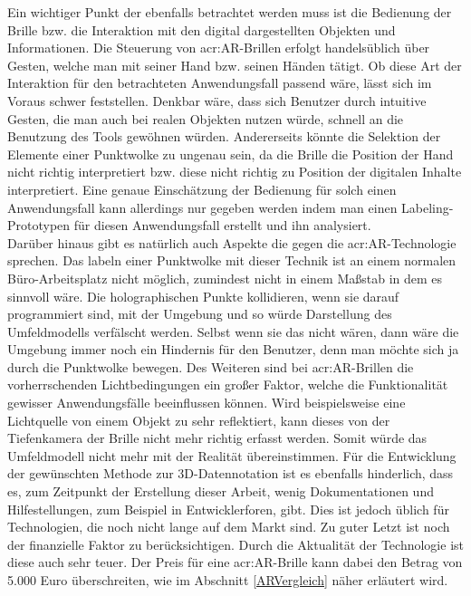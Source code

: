 Ein wichtiger Punkt der ebenfalls betrachtet werden muss ist die Bedienung der Brille bzw. die Interaktion mit den digital dargestellten Objekten und Informationen. Die Steuerung von \acrshort{acr:AR}-Brillen erfolgt handelsüblich über Gesten, welche man mit seiner Hand bzw. seinen Händen tätigt. Ob diese Art der Interaktion für den betrachteten Anwendungsfall passend wäre, lässt sich im Voraus schwer feststellen. Denkbar wäre, dass sich Benutzer durch intuitive Gesten, die man auch bei realen Objekten nutzen würde, schnell an die Benutzung des Tools gewöhnen würden. Andererseits könnte die Selektion der Elemente einer Punktwolke zu ungenau sein, da die Brille die Position der Hand nicht richtig interpretiert bzw. diese nicht richtig zu Position der digitalen Inhalte interpretiert. Eine genaue Einschätzung der Bedienung für solch einen Anwendungsfall kann allerdings nur gegeben werden indem man einen Labeling-Prototypen für diesen Anwendungsfall erstellt und ihn analysiert.\\  

Darüber hinaus gibt es natürlich auch Aspekte die gegen die \acrshort{acr:AR}-Technologie sprechen. Das labeln einer Punktwolke mit dieser Technik ist an einem normalen Büro-Arbeitsplatz nicht möglich, zumindest nicht in einem Maßstab in dem es sinnvoll wäre. Die holographischen Punkte kollidieren, wenn sie darauf programmiert sind, mit der Umgebung und so würde Darstellung des Umfeldmodells verfälscht werden. Selbst wenn sie das nicht wären, dann wäre die Umgebung immer noch ein Hindernis für den Benutzer, denn man möchte sich ja durch die Punktwolke bewegen. Des Weiteren sind bei \acrshort{acr:AR}-Brillen die vorherrschenden Lichtbedingungen ein großer Faktor, welche die Funktionalität gewisser Anwendungsfälle beeinflussen können. Wird beispielsweise eine Lichtquelle von einem Objekt zu sehr reflektiert, kann dieses von der Tiefenkamera der Brille nicht mehr richtig erfasst werden. Somit würde das Umfeldmodell nicht mehr mit der Realität übereinstimmen. Für die Entwicklung der gewünschten Methode zur 3D-Datennotation ist es ebenfalls hinderlich, dass es, zum Zeitpunkt der Erstellung dieser Arbeit, wenig Dokumentationen und Hilfestellungen, zum Beispiel in Entwicklerforen, gibt. Dies ist jedoch üblich für Technologien, die noch nicht lange auf dem Markt sind. Zu guter Letzt ist noch der finanzielle Faktor zu berücksichtigen. Durch die Aktualität der Technologie ist diese auch sehr teuer. Der Preis für eine \acrshort{acr:AR}-Brille kann dabei den Betrag von 5.000 Euro überschreiten, wie im  Abschnitt \ref{ARVergleich} näher erläutert wird.    


